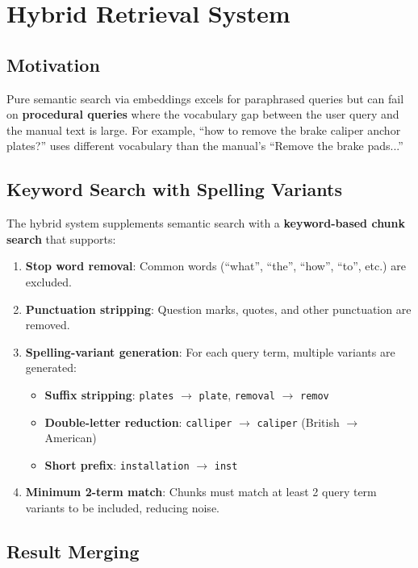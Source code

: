 \documentclass[12pt, a4paper]{article}
\begin{document}
\section{Hybrid Retrieval System}

\subsection{Motivation}

Pure semantic search via embeddings excels for paraphrased queries but can fail on \textbf{procedural queries} where the vocabulary gap between the user query and the manual text is large. For example, ``how to remove the brake caliper anchor plates?'' uses different vocabulary than the manual's ``Remove the brake pads...''

\subsection{Keyword Search with Spelling Variants}

The hybrid system supplements semantic search with a \textbf{keyword-based chunk search} that supports:

\begin{enumerate}[itemsep=2pt]
  \item \textbf{Stop word removal}: Common words (``what'', ``the'', ``how'', ``to'', etc.) are excluded.
  \item \textbf{Punctuation stripping}: Question marks, quotes, and other punctuation are removed.
  \item \textbf{Spelling-variant generation}: For each query term, multiple variants are generated:
  \begin{itemize}
    \item \textbf{Suffix stripping}: \texttt{plates} $\rightarrow$ \texttt{plate}, \texttt{removal} $\rightarrow$ \texttt{remov}
    \item \textbf{Double-letter reduction}: \texttt{calliper} $\rightarrow$ \texttt{caliper} (British $\rightarrow$ American)
    \item \textbf{Short prefix}: \texttt{installation} $\rightarrow$ \texttt{inst}
  \end{itemize}
  \item \textbf{Minimum 2-term match}: Chunks must match at least 2 query term variants to be included, reducing noise.
\end{enumerate}

\subsection{Result Merging}
\end{document}
